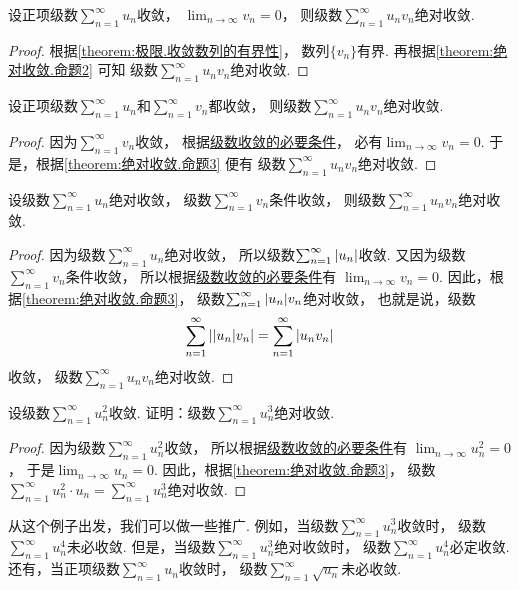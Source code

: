 \begin{proposition}\label{theorem:绝对收敛.命题3}
设正项级数\(\sum_{n=1}^\infty u_n\)收敛，
\(\lim_{n\to\infty} v_n = 0\)，
则级数\(\sum_{n=1}^\infty u_n v_n\)绝对收敛.
\begin{proof}
根据\cref{theorem:极限.收敛数列的有界性}，
数列\(\{v_n\}\)有界.
再根据\cref{theorem:绝对收敛.命题2} 可知
级数\(\sum_{n=1}^\infty u_n v_n\)绝对收敛.
\end{proof}
\end{proposition}

\begin{proposition}\label{theorem:绝对收敛.命题4}
设正项级数\(\sum_{n=1}^\infty u_n\)和\(\sum_{n=1}^\infty v_n\)都收敛，
则级数\(\sum_{n=1}^\infty u_n v_n\)绝对收敛.
\begin{proof}
因为\(\sum_{n=1}^\infty v_n\)收敛，
根据\hyperref[theorem:无穷级数.收敛级数性质5]{级数收敛的必要条件}，
必有\(\lim_{n\to\infty} v_n = 0\).
于是，根据\cref{theorem:绝对收敛.命题3} 便有
级数\(\sum_{n=1}^\infty u_n v_n\)绝对收敛.
\end{proof}
\end{proposition}

\begin{proposition}\label{theorem:绝对收敛.命题5}
设级数\(\sum_{n=1}^\infty u_n\)绝对收敛，
级数\(\sum_{n=1}^\infty v_n\)条件收敛，
则级数\(\sum_{n=1}^\infty u_n v_n\)绝对收敛.
\begin{proof}
因为级数\(\sum_{n=1}^\infty u_n\)绝对收敛，
所以级数\(\sum_{n=1}^\infty \abs{u_n}\)收敛.
又因为级数\(\sum_{n=1}^\infty v_n\)条件收敛，
所以根据\hyperref[theorem:无穷级数.收敛级数性质5]{级数收敛的必要条件}有
\(\lim_{n\to\infty} v_n = 0\).
因此，根据\cref{theorem:绝对收敛.命题3}，
级数\(\sum_{n=1}^\infty \abs{u_n} v_n\)绝对收敛，
也就是说，级数\[
	\sum_{n=1}^\infty \abs{\abs{u_n} v_n}
	= \sum_{n=1}^\infty \abs{u_n v_n}
\]收敛，
级数\(\sum_{n=1}^\infty u_n v_n\)绝对收敛.
\end{proof}
\end{proposition}

\begin{example}
设级数\(\sum_{n=1}^\infty u_n^2\)收敛.
证明：级数\(\sum_{n=1}^\infty u_n^3\)绝对收敛.
\begin{proof}
因为级数\(\sum_{n=1}^\infty u_n^2\)收敛，
所以根据\hyperref[theorem:无穷级数.收敛级数性质5]{级数收敛的必要条件}有
\(\lim_{n\to\infty} u_n^2 = 0\)，
于是\(\lim_{n\to\infty} u_n = 0\).
因此，根据\cref{theorem:绝对收敛.命题3}，
级数\(\sum_{n=1}^\infty u_n^2 \cdot u_n
= \sum_{n=1}^\infty u_n^3\)绝对收敛.
\end{proof}
\end{example}
从这个例子出发，我们可以做一些推广.
例如，当级数\(\sum_{n=1}^\infty u_n^3\)收敛时，
级数\(\sum_{n=1}^\infty u_n^4\)未必收敛.
但是，当级数\(\sum_{n=1}^\infty u_n^3\)绝对收敛时，
级数\(\sum_{n=1}^\infty u_n^4\)必定收敛.
还有，当正项级数\(\sum_{n=1}^\infty u_n\)收敛时，
级数\(\sum_{n=1}^\infty \sqrt{u_n}\)未必收敛.

